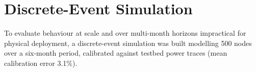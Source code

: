 \section{Discrete-Event Simulation}
To evaluate behaviour at scale and over multi-month horizons impractical for physical
deployment, a discrete-event simulation was built modelling 500 nodes over a six-month
period, calibrated against testbed power traces (mean calibration error 3.1\%).
